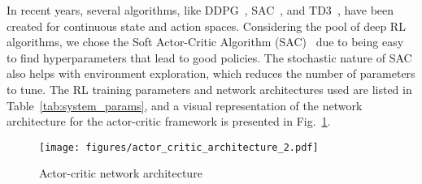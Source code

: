 In recent years, several algorithms, like DDPG~\cite{lillicrap2015continuous}, SAC~\cite{haarnoja2018soft}, and TD3~\cite{fujimoto2018addressing}, have been created for continuous state and action spaces.  Considering the pool of deep RL algorithms, we chose the Soft Actor-Critic Algorithm (SAC)~\cite{haarnoja2018soft} due to being easy to find hyperparameters that lead to good policies. The stochastic nature of SAC also helps with environment exploration, which reduces the number of parameters to tune. The RL training parameters and network architectures used are listed in Table~\ref{tab:system_params}, and a visual representation of the network architecture for the actor-critic framework is presented in Fig.\ \ref{fig:actor_critic_architecture}.

\begin{figure} 
    \centering
    \texttt{[image: figures/actor\_critic\_architecture\_2.pdf]}
  \caption{Actor-critic network architecture}
  \label{fig:actor_critic_architecture} 
\end{figure}

